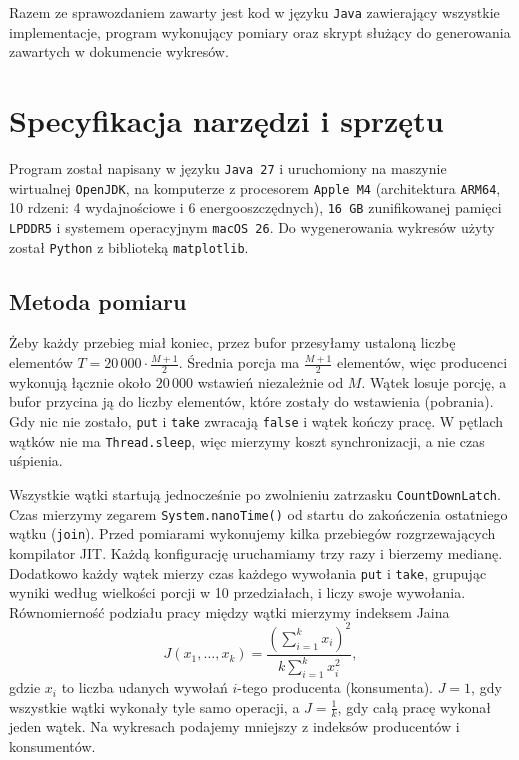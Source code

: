 \documentclass[11pt,a4paper]{article}
\begin{document}
Razem ze sprawozdaniem zawarty jest kod w języku \texttt{Java} zawierający
wszystkie implementacje, program wykonujący pomiary
oraz skrypt służący do generowania zawartych w dokumencie wykresów.

\section{Specyfikacja narzędzi i sprzętu}
Program został napisany w języku \texttt{Java 27} i uruchomiony na maszynie wirtualnej
\texttt{OpenJDK}, na komputerze z procesorem \texttt{Apple M4} (architektura \texttt{ARM64},
10 rdzeni: 4 wydajnościowe i 6 energooszczędnych), \texttt{16 GB} zunifikowanej pamięci
\texttt{LPDDR5} i systemem operacyjnym \texttt{macOS 26}.
Do wygenerowania wykresów użyty został \texttt{Python} z biblioteką \texttt{matplotlib}.

\subsection{Metoda pomiaru}
Żeby każdy przebieg miał koniec, przez bufor przesyłamy ustaloną liczbę elementów
$T = 20\,000 \cdot \frac{M + 1}{2}$. Średnia porcja ma $\frac{M+1}{2}$ elementów,
więc producenci wykonują łącznie około $20\,000$ wstawień niezależnie od $M$.
Wątek losuje porcję, a bufor przycina ją do liczby elementów, które zostały do wstawienia
(pobrania). Gdy nic nie zostało, \texttt{put} i \texttt{take} zwracają \texttt{false} i wątek kończy pracę.
W pętlach wątków nie ma \texttt{Thread.sleep}, więc mierzymy koszt synchronizacji, a nie czas uśpienia.

Wszystkie wątki startują jednocześnie po zwolnieniu zatrzasku \texttt{CountDownLatch}.
Czas mierzymy zegarem \texttt{System.nanoTime()} od startu do zakończenia ostatniego wątku
(\texttt{join}). Przed pomiarami wykonujemy kilka przebiegów rozgrzewających kompilator JIT.
Każdą konfigurację uruchamiamy trzy razy i bierzemy medianę.
Dodatkowo każdy wątek mierzy czas każdego wywołania \texttt{put} i \texttt{take},
grupując wyniki według wielkości porcji w 10 przedziałach, i liczy swoje wywołania.
Równomierność podziału pracy między wątki mierzymy indeksem Jaina
\[
    J(x_1, \dots, x_k) = \frac{\left(\sum_{i=1}^{k} x_i\right)^2}{k \sum_{i=1}^{k} x_i^2},
\]
gdzie $x_i$ to liczba udanych wywołań $i$-tego producenta (konsumenta).
$J = 1$, gdy wszystkie wątki wykonały tyle samo operacji, a $J = \frac{1}{k}$,
gdy całą pracę wykonał jeden wątek. Na wykresach podajemy mniejszy z indeksów
producentów i konsumentów.
\end{document}
